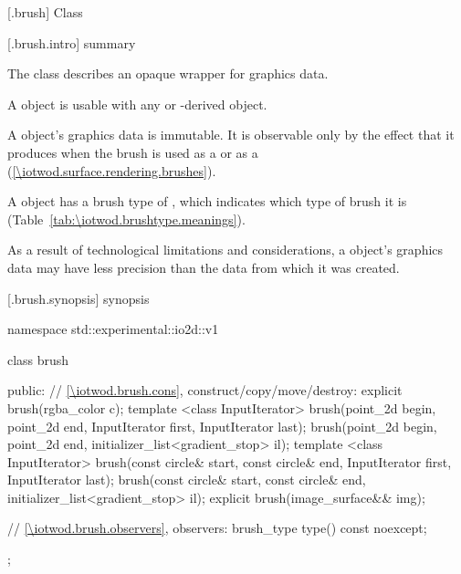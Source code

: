  [\iotwod.brush] {Class }

 [\iotwod.brush.intro] { summary}

\pnum
{}%
The class  describes an opaque wrapper for graphics data.

\pnum
A  object is usable with any  or -derived object.

\pnum
A  object's graphics data is immutable. It is observable only by the effect that it produces when the brush is used as a  or as a  (\ref{\iotwod.surface.rendering.brushes}).

\pnum
A  object has a brush type of , which indicates which type of brush it is (Table~\ref{tab:\iotwod.brushtype.meanings}).

\pnum
As a result of technological limitations and considerations, a  object's graphics data may have less precision than the data from which it was created.

%
 [\iotwod.brush.synopsis] { synopsis}

\begin{codeblock}
namespace std::experimental::io2d::v1 {
  class brush {
  public:
    // \ref{\iotwod.brush.cons}, construct/copy/move/destroy:
    explicit brush(rgba_color c);
    template <class InputIterator>
    brush(point_2d begin, point_2d end,
      InputIterator first, InputIterator last);
    brush(point_2d begin, point_2d end,
      initializer_list<gradient_stop> il);
    template <class InputIterator>
    brush(const circle& start, const circle& end,
      InputIterator first, InputIterator last);
    brush(const circle& start, const circle& end,
      initializer_list<gradient_stop> il);
    explicit brush(image_surface&& img);

    // \ref{\iotwod.brush.observers}, observers:
    brush_type type() const noexcept;
  };
}
\end{codeblock}

